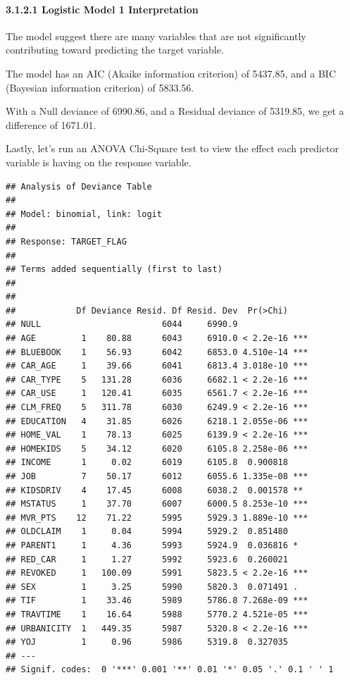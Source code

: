 \documentclass[]{article}
\let\oldparagraph\paragraph
\renewcommand{\paragraph}[1]{\oldparagraph{#1}\mbox{}}
\begin{document}
\paragraph{3.1.2.1 Logistic Model 1
Interpretation}\label{logistic-model-1-interpretation}

The model suggest there are many variables that are not significantly
contributing toward predicting the target variable.

The model has an AIC (Akaike information criterion) of 5437.85, and a
BIC (Bayesian information criterion) of 5833.56.

With a Null deviance of 6990.86, and a Residual deviance of 5319.85, we
get a difference of 1671.01.

Lastly, let's run an ANOVA Chi-Square test to view the effect each
predictor variable is having on the response variable.

\begin{verbatim}
## Analysis of Deviance Table
## 
## Model: binomial, link: logit
## 
## Response: TARGET_FLAG
## 
## Terms added sequentially (first to last)
## 
## 
##            Df Deviance Resid. Df Resid. Dev  Pr(>Chi)    
## NULL                        6044     6990.9              
## AGE         1    80.88      6043     6910.0 < 2.2e-16 ***
## BLUEBOOK    1    56.93      6042     6853.0 4.510e-14 ***
## CAR_AGE     1    39.66      6041     6813.4 3.018e-10 ***
## CAR_TYPE    5   131.28      6036     6682.1 < 2.2e-16 ***
## CAR_USE     1   120.41      6035     6561.7 < 2.2e-16 ***
## CLM_FREQ    5   311.78      6030     6249.9 < 2.2e-16 ***
## EDUCATION   4    31.85      6026     6218.1 2.055e-06 ***
## HOME_VAL    1    78.13      6025     6139.9 < 2.2e-16 ***
## HOMEKIDS    5    34.12      6020     6105.8 2.258e-06 ***
## INCOME      1     0.02      6019     6105.8  0.900818    
## JOB         7    50.17      6012     6055.6 1.335e-08 ***
## KIDSDRIV    4    17.45      6008     6038.2  0.001578 ** 
## MSTATUS     1    37.70      6007     6000.5 8.253e-10 ***
## MVR_PTS    12    71.22      5995     5929.3 1.889e-10 ***
## OLDCLAIM    1     0.04      5994     5929.2  0.851480    
## PARENT1     1     4.36      5993     5924.9  0.036816 *  
## RED_CAR     1     1.27      5992     5923.6  0.260021    
## REVOKED     1   100.09      5991     5823.5 < 2.2e-16 ***
## SEX         1     3.25      5990     5820.3  0.071491 .  
## TIF         1    33.46      5989     5786.8 7.268e-09 ***
## TRAVTIME    1    16.64      5988     5770.2 4.521e-05 ***
## URBANICITY  1   449.35      5987     5320.8 < 2.2e-16 ***
## YOJ         1     0.96      5986     5319.8  0.327035    
## ---
## Signif. codes:  0 '***' 0.001 '**' 0.01 '*' 0.05 '.' 0.1 ' ' 1
\end{verbatim}
\end{document}

